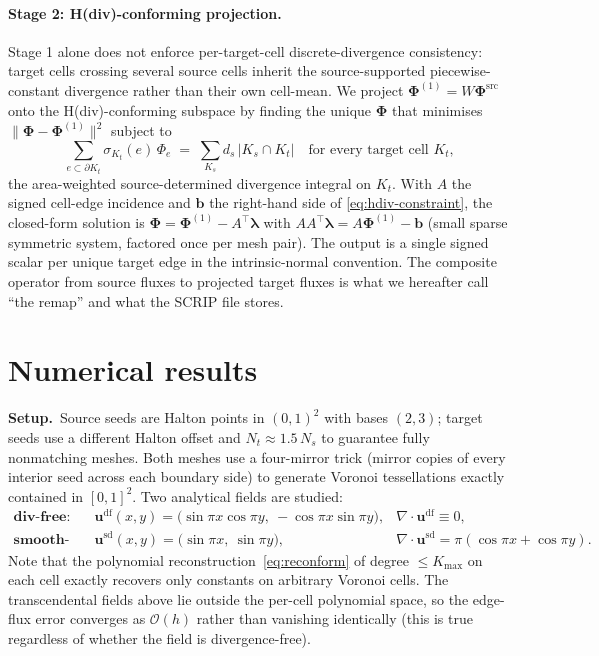 \documentclass[10pt]{article}
\newcommand{\uvec}{\mathbf{u}}
\begin{document}
\paragraph{Stage 2: H(div)-conforming projection.}
Stage 1 alone does not enforce per-target-cell discrete-divergence consistency: target cells crossing several source cells inherit the source-supported piecewise-constant divergence rather than their own cell-mean. We project $\boldsymbol\Phi^{(1)} = W\boldsymbol\Phi^{\mathrm{src}}$ onto the H(div)-conforming subspace \cite{ArnoldFalkWinther2006,BeiraoDaVeigaMixed2016} by finding the unique $\boldsymbol\Phi$ that minimises $\|\boldsymbol\Phi - \boldsymbol\Phi^{(1)}\|^2$ subject to
\begin{equation}
\sum_{e \subset \partial K_t}\!\sigma_{K_t}(e)\,\Phi_e \;=\; \sum_{K_s} d_s\,|K_s\!\cap\!K_t|
\quad\text{for every target cell }K_t,
\label{eq:hdiv-constraint}
\end{equation}
the area-weighted source-determined divergence integral on $K_t$. With $A$ the signed cell-edge incidence and $\mathbf{b}$ the right-hand side of \eqref{eq:hdiv-constraint}, the closed-form solution is $\boldsymbol\Phi = \boldsymbol\Phi^{(1)} - A^{\!\top}\!\boldsymbol\lambda$ with $A A^{\!\top}\boldsymbol\lambda = A\boldsymbol\Phi^{(1)} - \mathbf{b}$ (small sparse symmetric system, factored once per mesh pair). The output is a single signed scalar per unique target edge in the intrinsic-normal convention. The composite operator from source fluxes to projected target fluxes is what we hereafter call ``the remap'' and what the SCRIP file stores.

\section{Numerical results}

\noindent\textbf{Setup.}\,
Source seeds are Halton points in $(0,1)^2$ with bases $(2,3)$; target seeds use a different Halton offset and $N_t \approx 1.5\,N_s$ to guarantee fully nonmatching meshes. Both meshes use a four-mirror trick (mirror copies of every interior seed across each boundary side) to generate Voronoi tessellations exactly contained in $[0,1]^2$. Two analytical fields are studied:
\begin{align*}
\textbf{div-free:}\quad & \uvec^{\mathrm{df}}(x,y) = \bigl(\sin\!\pi x \cos\!\pi y,\ -\!\cos\!\pi x \sin\!\pi y\bigr),
& \nabla\!\cdot\!\uvec^{\mathrm{df}} \equiv 0,\\[1pt]
\textbf{smooth-div:}\quad & \uvec^{\mathrm{sd}}(x,y) = \bigl(\sin\!\pi x,\ \sin\!\pi y\bigr),
& \nabla\!\cdot\!\uvec^{\mathrm{sd}} = \pi(\cos\!\pi x + \cos\!\pi y).
\end{align*}
Note that the polynomial reconstruction~\eqref{eq:reconform} of degree $\le K_{\max}$ on each cell exactly recovers only constants on arbitrary Voronoi cells. The transcendental fields above lie outside the per-cell polynomial space, so the edge-flux error converges as $\mathcal{O}(h)$ rather than vanishing identically (this is true regardless of whether the field is divergence-free).
\end{document}
